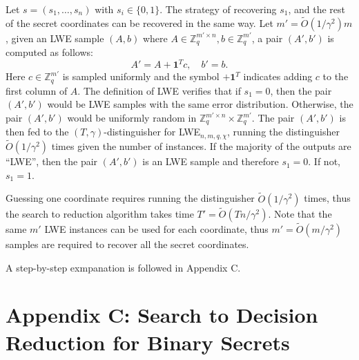 \documentclass{article}
\begin{document}
    Let \( s = (s_1, \ldots, s_n) \) with \( s_i \in \{0, 1\} \). The strategy of recovering \( s_1 \), and the rest of the secret coordinates can be recovered in the same way. Let \( m' = \tilde{O}(1/\gamma^2)m \), given an LWE sample \( (A, b) \) where \( A \in \mathbb{Z}_q^{m' \times n}, b \in \mathbb{Z}_q^{m'} \), a pair \( (A', b') \) is computed as follows:
    \[
    A' = A + \mathbf{1}^T c, \quad b' = b.
    \]
    Here \( c \in \mathbb{Z}_q^{m'} \) is sampled uniformly and the symbol \( +\mathbf{1}^T \) indicates adding \( c \) to the first column of \( A \). The definition of LWE verifies that if \( s_1 = 0 \), then the pair \( (A', b') \) would be LWE samples with the same error distribution. Otherwise, the pair \( (A', b') \) would be uniformly random in \( \mathbb{Z}_q^{m' \times n} \times \mathbb{Z}_q^{m'} \). The pair \( (A', b') \) is then fed to the \( (T, \gamma) \)-distinguisher for LWE$_{n,m,q,\chi}$, running the distinguisher \( \tilde{O}(1/\gamma^2) \) times given the number of instances. If the majority of the outputs are “LWE”, then the pair \( (A', b') \) is an LWE sample and therefore \( s_1 = 0 \). If not, \( s_1 = 1 \).
    
    Guessing one coordinate requires running the distinguisher \( \tilde{O}(1/\gamma^2) \) times, thus the search to reduction algorithm takes time \( T' = \tilde{O}(Tn/\gamma^2) \). Note that the same \( m' \) LWE instances can be used for each coordinate, thus \( m' = \tilde{O}(m/\gamma^2) \) samples are required to recover all the secret coordinates.
    
    A step-by-step exmpanation is followed in Appendix C.

    \section*{Appendix C: Search to Decision Reduction for Binary Secrets}
    
\end{document}

